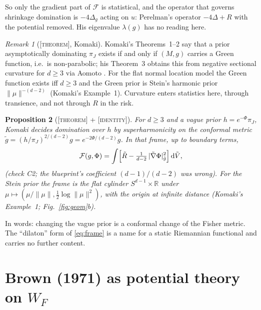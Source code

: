 \documentclass[a4paper,11pt,noarxiv]{quantumarticle}
\newcommand{\R}{\mathbb{R}}
\newcommand{\norm}[1]{\lVert #1\rVert}
\newcommand{\abs}[1]{\lvert #1\rvert}
\newcommand{\dd}{\,\mathrm{d}}
\newcommand{\grad}{\nabla}
\newcommand{\status}[1]{\textsc{\small [#1]}}
\theoremstyle{plain}
\newtheorem{proposition}{Proposition}
\theoremstyle{definition}
\theoremstyle{remark}
\newtheorem{remark}[proposition]{Remark}
\begin{document}
So only the gradient part of $\mathcal F$ is statistical, and the
operator that governs shrinkage domination is $-4\Delta_g$ acting on
$u$: Perelman's operator $-4\Delta+R$ with the potential removed. His
eigenvalue $\lambda(g)$ has no reading here.

\begin{remark}[\status{theorem}, Komaki]\label{rem:k3}
Komaki's Theorems~1--2 \cite{komaki2006} say that a prior
asymptotically dominating $\pi_J$ exists if and only if $(M,g)$ carries
a Green function, i.e.\ is non-parabolic; his Theorem~3 obtains this
from negative sectional curvature for $d\ge3$ via Aomoto
\cite{aomoto1966}. For the flat normal location model the Green
function exists iff $d\ge3$ and the Green prior is Stein's harmonic
prior $\norm{\mu}^{-(d-2)}$ (Komaki's Example~1). Curvature enters
statistics here, through transience, and not through $R$ in the risk.
\end{remark}

\begin{proposition}[\status{theorem} + \status{identity}]\label{prop:k5}
For $d\ge3$ and a vague prior $h=e^{-\Phi}\pi_J$, Komaki
\cite[\S3, Theorems 4--6]{komaki2006} decides domination over $h$ by
superharmonicity on the conformal metric
$\tilde g=(h/\pi_J)^{2/(d-2)}g=e^{-2\Phi/(d-2)}g$. In that frame,
up to boundary terms,
\begin{equation}\label{eq:frame}
\mathcal F(g,\Phi)=\int\Bigl[\tilde R-\tfrac{1}{d-2}\,
\abs{\tilde\grad\Phi}^2_{\tilde g}\Bigr]\dd\tilde V,
\end{equation}
(check C2; the blueprint's coefficient $(d-1)/(d-2)$ was wrong). For
the Stein prior the frame is the flat cylinder $S^{d-1}\times\R$ under
$\mu\mapsto(\mu/\norm{\mu},\tfrac12\log\norm{\mu}^2)$, with the origin
at infinite distance (Komaki's Example~1; Fig.~\ref{fig:geom}b).
\end{proposition}

In words: changing the vague prior is a conformal change of the Fisher
metric. The ``dilaton'' form of \eqref{eq:frame} is a name for a
static Riemannian functional and carries no further content.

\section{Brown (1971) as potential theory on \texorpdfstring{$W_F$}{W\_F}}
\label{sec:brown}
\end{document}
